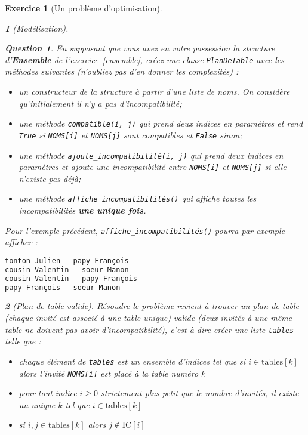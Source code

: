 \documentclass{article}
\theoremstyle{exostyle}
\newtheorem{exo}{Exercice}
\theoremstyle{partiestyle}
\newtheorem{partie}{}[exo]
\theoremstyle{questionstyle}
\newtheorem{questionpartie}{Question}[partie]
\begin{document}
\begin{exo}[Un problème d'optimisation]
\begin{partie}[Modélisation]
\begin{questionpartie} 
En supposant que vous avez en votre possession la structure d'{\bf Ensemble} de l'exercice~\ref{ensemble}, créez une classe \verb+PlanDeTable+ avec les méthodes suivantes (n'oubliez pas d'en donner les complexités) :
\begin{itemize}
    \item un constructeur de la structure à partir d'une liste de noms. On considère qu'initialement il n'y a pas d'incompatibilité;
    \item une méthode \verb|compatible(i, j)| qui prend deux indices en paramètres et rend \verb|True| si \verb|NOMS[i]| et \verb|NOMS[j]| sont compatibles et \verb|False| sinon;
    \item une méthode \verb|ajoute_incompatibilité(i, j)| qui prend deux indices en paramètres et ajoute une incompatibilité entre \verb|NOMS[i]| et \verb|NOMS[j]| si elle n'existe pas déjà;
    \item une méthode \verb|affiche_incompatibilités()| qui affiche toutes les incompatibilités {\bf une unique fois}.
\end{itemize}
\end{questionpartie} 

Pour l'exemple précédent, \verb|affiche_incompatibilités()| pourra par exemple afficher :

\begin{lstlisting}[language=Python]
tonton Julien - papy François
cousin Valentin - soeur Manon
cousin Valentin - papy François
papy François - soeur Manon
\end{lstlisting}
\end{partie}
\begin{partie}[Plan de table valide]

Résoudre le problème revient à trouver un plan de table (chaque invité est associé à une table unique) valide (deux invités à une même table ne doivent pas avoir d'incompatibilité), c'est-à-dire créer une liste \verb|tables| telle que :

\begin{itemize}
\item chaque élément de \verb|tables| est un ensemble d'indices tel que si $i \in \mbox{tables}[k]$ alors l'invité \verb|NOMS[i]| est placé à la table numéro $k$
\item pour tout indice $i\geq 0$ strictement plus petit que le nombre d'invités, il existe un unique $k$ tel que $i \in \mbox{tables}[k]$
\item si $i, j \in \mbox{tables}[k]$ alors $j \notin \mbox{IC}[i]$
\end{itemize}


\end{partie}
\end{exo}
\end{document}
